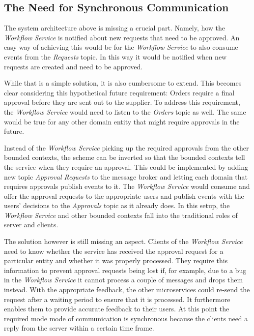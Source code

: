 \subsection{The Need for Synchronous Communication}

The system architecture above is missing a crucial part.
Namely, how the \emph{Workflow Service} is notified about new requests that need to be approved.
An easy way of achieving this would be for the \emph{Workflow Service} to also consume events from the \emph{Requests} topic.
In this way it would be notified when new requests are created and need to be approved.

While that is a simple solution, it is also cumbersome to extend.
This becomes clear considering this hypothetical future requirement: Orders require a final approval before they are sent out to the supplier.
To address this requirement, the \emph{Workflow Service} would need to listen to the \emph{Orders} topic as well.
The same would be true for any other domain entity that might require approvals in the future.

Instead of the \emph{Workflow Service} picking up the required approvals from the other bounded contexts, the scheme can be inverted so that the bounded contexts tell the service when they require an approval.
This could be implemented by adding new topic \emph{Approval Requests} to the message broker and letting each domain that requires approvals publish events to it.
The \emph{Workflow Service} would consume and offer the approval requests to the appropriate users and publish events with the users' decisions to the \emph{Approvals} topic as it already does.
In this setup, the \emph{Workflow Service} and other bounded contexts fall into the traditional roles of server and clients.

The solution however is still missing an aspect.
Clients of the \emph{Workflow Service} need to know whether the service has received the approval request for a particular entity and whether it was properly processed.
They require this information to prevent approval requests being lost if, for example, due to a bug in the \emph{Workflow Service} it cannot process a couple of messages and drops them instead.
With the appropriate feedback, the other microservices could re-send the request after a waiting period to ensure that it is processed.
It furthermore enables them to provide accurate feedback to their users.
At this point the required mode mode of communication is synchronous because the clients need a reply from the server within a certain time frame.

